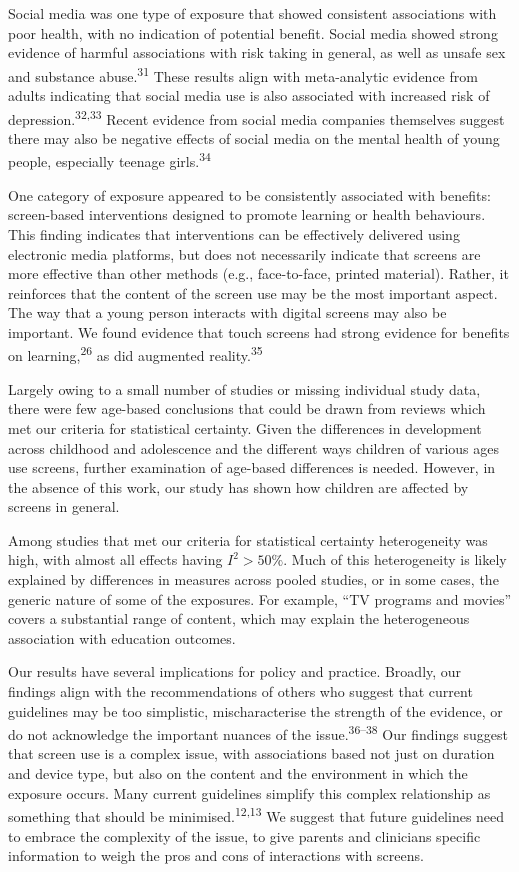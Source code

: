 \documentclass[
  english,
  man]{apa6}
\begin{document}
Social media was one type of exposure that showed consistent associations with poor health, with no indication of potential benefit.
Social media showed strong evidence of harmful associations with risk taking in general, as well as unsafe sex and substance abuse.\textsuperscript{31}
These results align with meta-analytic evidence from adults indicating that social media use is also associated with increased risk of depression.\textsuperscript{32,33}
Recent evidence from social media companies themselves suggest there may also be negative effects of social media on the mental health of young people, especially teenage girls.\textsuperscript{34}

One category of exposure appeared to be consistently associated with benefits: screen-based interventions designed to promote learning or health behaviours.
This finding indicates that interventions can be effectively delivered using electronic media platforms, but does not necessarily indicate that screens are more effective than other methods (e.g., face-to-face, printed material).
Rather, it reinforces that the content of the screen use may be the most important aspect.
The way that a young person interacts with digital screens may also be important.
We found evidence that touch screens had strong evidence for benefits on learning,\textsuperscript{26} as did augmented reality.\textsuperscript{35}

Largely owing to a small number of studies or missing individual study data, there were few age-based conclusions that could be drawn from reviews which met our criteria for statistical certainty.
Given the differences in development across childhood and adolescence and the different ways children of various ages use screens, further examination of age-based differences is needed.
However, in the absence of this work, our study has shown how children are affected by screens in general.

Among studies that met our criteria for statistical certainty heterogeneity was high, with almost all effects having \(I^2 > 50\%\).
Much of this heterogeneity is likely explained by differences in measures across pooled studies, or in some cases, the generic nature of some of the exposures.
For example, ``TV programs and movies'' covers a substantial range of content, which may explain the heterogeneous association with education outcomes.

Our results have several implications for policy and practice.
Broadly, our findings align with the recommendations of others who suggest that current guidelines may be too simplistic, mischaracterise the strength of the evidence, or do not acknowledge the important nuances of the issue.\textsuperscript{36--38}
Our findings suggest that screen use is a complex issue, with associations based not just on duration and device type, but also on the content and the environment in which the exposure occurs.
Many current guidelines simplify this complex relationship as something that should be minimised.\textsuperscript{12,13}
We suggest that future guidelines need to embrace the complexity of the issue, to give parents and clinicians specific information to weigh the pros and cons of interactions with screens.
\end{document}
